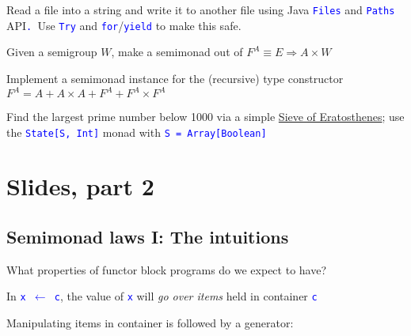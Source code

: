Read a file into a string and write it to another file using Java
\texttt{\textcolor{blue}{\footnotesize{}Files}} and \texttt{\textcolor{blue}{\footnotesize{}Paths}}
API\texttt{\textcolor{blue}{\footnotesize{}. }}Use \texttt{\textcolor{blue}{\footnotesize{}Try}}
and \texttt{\textcolor{blue}{\footnotesize{}for}}/\texttt{\textcolor{blue}{\footnotesize{}yield}}
to make this safe.

Given a semigroup $W$, make a semimonad out of $F^{A}\equiv E\Rightarrow A\times W$ 

Implement a semimonad instance for the (recursive) type constructor
$F^{A}=A+A\times A+F^{A}+F^{A}\times F^{A}$

Find the largest prime number below 1000 via a simple \href{https://en.wikipedia.org/wiki/Sieve_of_Eratosthenes}{Sieve of Eratosthenes};
use the \texttt{\textcolor{blue}{\footnotesize{}State{[}S, Int{]}}}
monad with \texttt{\textcolor{blue}{\footnotesize{}S = Array{[}Boolean{]}}} 

\section{Slides, part 2}

\subsection{Semimonad laws I: The intuitions}

What properties of functor block programs do we expect to have?

In \texttt{\textcolor{blue}{\footnotesize{}x $\leftarrow$ c}}, the
value of \texttt{\textcolor{blue}{\footnotesize{}x}} will \emph{go
over items} held in container \texttt{\textcolor{blue}{\footnotesize{}c}} 

Manipulating items in container is followed by a generator:

